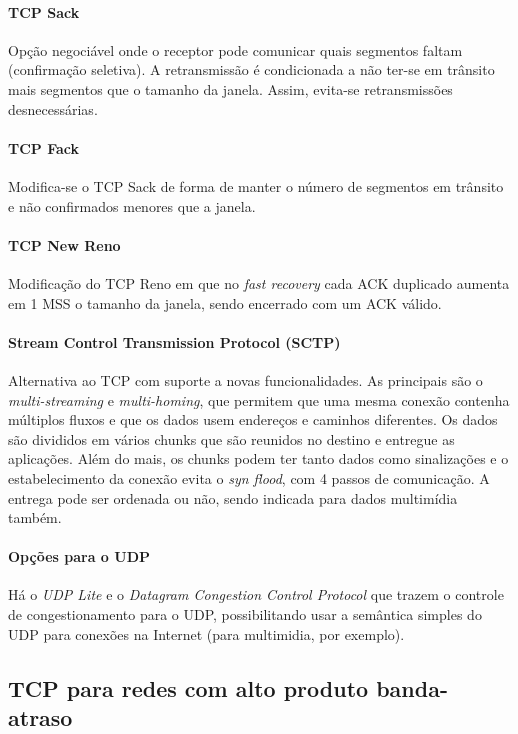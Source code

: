 \paragraph{TCP Sack} Opção negociável onde o receptor pode comunicar quais segmentos faltam (confirmação seletiva). 
A retransmissão é condicionada a não ter-se em trânsito mais segmentos que o tamanho da janela.
Assim, evita-se retransmissões desnecessárias.

\paragraph{TCP Fack} Modifica-se o TCP Sack de forma de manter o número de segmentos em trânsito e não confirmados menores que a janela.

\paragraph{TCP New Reno} Modificação do TCP Reno em que no \emph{fast recovery} cada ACK duplicado aumenta em 1 MSS o tamanho da janela, 
sendo encerrado com um ACK válido.

\paragraph{Stream Control Transmission Protocol (SCTP)} 
Alternativa ao TCP com suporte a novas funcionalidades.
As principais são o \emph{multi-streaming} e \emph{multi-homing}, que permitem que uma mesma conexão contenha múltiplos fluxos e que os dados usem endereços e caminhos diferentes.
Os dados são divididos em vários chunks que são reunidos no destino e entregue as aplicações. 
Além do mais, os chunks podem ter tanto dados como sinalizações e o estabelecimento da conexão evita o \emph{syn flood}, com 4 passos de comunicação.
A entrega pode ser ordenada ou não, sendo indicada para dados multimídia também.

\paragraph{Opções para o UDP} Há o \emph{UDP Lite} e o \emph{Datagram Congestion Control Protocol} que trazem o controle de congestionamento para o UDP, 
possibilitando usar a semântica simples do UDP para conexões na Internet (para multimidia, por exemplo).

\subsection{TCP para redes com alto produto banda-atraso}

